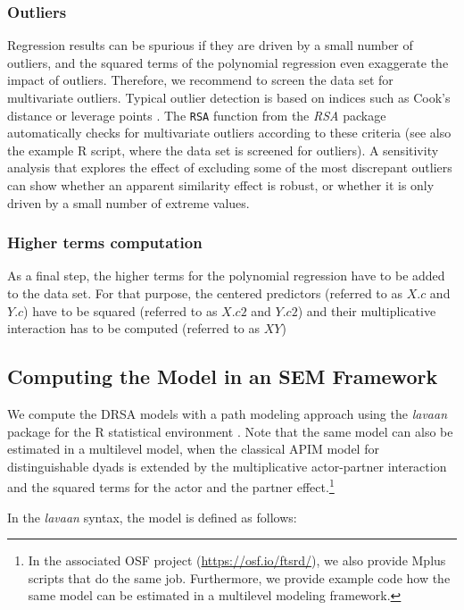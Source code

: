 \documentclass[jou,a4paper,draftfirst]{apa6}
\begin{document}
\subsubsection{Outliers}
Regression results can be spurious if they are driven by a small number of outliers, and the squared terms of the polynomial regression even exaggerate the impact of outliers. Therefore, we recommend to screen the data set for multivariate outliers. Typical outlier detection is based on indices such as Cook's distance or leverage points \parencite[e.g.,][]{bollen_regression_1985}. The {\tt RSA} function from the \textit{RSA} package automatically checks for multivariate outliers according to these criteria (see also the example R script, where the data set is screened for outliers). A sensitivity analysis that explores the effect of excluding some of the most discrepant outliers can show whether an apparent similarity effect is robust, or whether it is only driven by a small number of extreme values.


\subsubsection{Higher terms computation}
As a final step, the higher terms for the polynomial regression have to be added to the data set. For that purpose, the centered predictors (referred to as $X.c$ and $Y.c$) have to be squared (referred to as $X.c2$ and $Y.c2$) and their multiplicative interaction has to be computed (referred to as $XY$)



\subsection{Computing the Model in an SEM Framework}
We compute the DRSA models with a path modeling approach using the \emph{lavaan} package \parencite{rosseel_lavaan:_2012-1} for the R statistical environment \parencite{r_core_team_r:_2014}. Note that the same model can also be estimated in a multilevel model, when the classical APIM model for distinguishable dyads \parencite{kenny_dyadic_2006} is extended by the multiplicative actor-partner interaction and the squared terms for the actor and the partner effect.\footnote{In the associated OSF project (\url{https://osf.io/ftsrd/}), we also provide Mplus scripts that do the same job. Furthermore, we provide example code how the same model can be estimated in a multilevel modeling framework.}


In the \textit{lavaan} syntax, the model is defined as follows:
\end{document}
